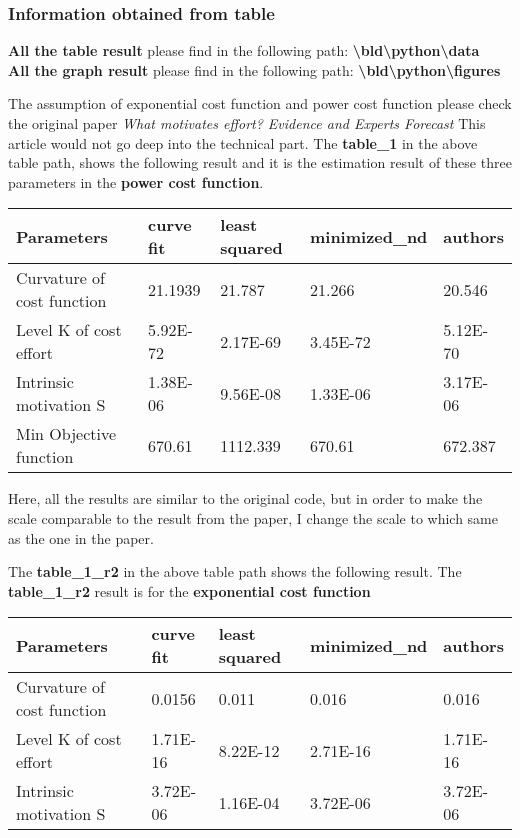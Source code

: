 \documentclass[11pt
]{article}
\begin{document}
\hypertarget{information-obtained-from-table}{%
\subsubsection{Information obtained from
table}\label{information-obtaining-from-table}}

\textbf{All the table result} please find in the following path:
\textbf{\textbackslash bld\textbackslash python\textbackslash data}\\
\textbf{All the graph result} please find in the following path:
\textbf{\textbackslash bld\textbackslash python\textbackslash figures}

The assumption of exponential cost function and power cost function
please check the original paper \emph{What motivates effort? Evidence
and Experts Forecast} This article would not go deep into the technical part.
The \textbf{table\_1} in the above table path, shows the following
result and it is the estimation result of these three parameters in the
\textbf{power cost function}.

\begin{longtable}[]{@{}lllll@{}}
\toprule()
Parameters & curve fit & least squared & minimized\_nd & authors \\
\midrule()
\endhead
Curvature of cost function & 21.1939 & 21.787 & 21.266 & 20.546 \\
Level K of cost effort & 5.92E-72 & 2.17E-69 & 3.45E-72 & 5.12E-70 \\
Intrinsic motivation S & 1.38E-06 & 9.56E-08 & 1.33E-06 & 3.17E-06 \\
Min Objective function & 670.61 & 1112.339 & 670.61 & 672.387 \\
\bottomrule()
\end{longtable}

Here, all the results are similar to the original code, but
in order to make the scale comparable to the result from the paper, I
change the scale to which same as the one in the paper.

The \textbf{table\_1\_r2} in the above table path shows the following
result. The \textbf{table\_1\_r2} result is for the \textbf{exponential
cost function}

\begin{longtable}[]{@{}lllll@{}}
\toprule()
Parameters & curve fit & least squared & minimized\_nd & authors \\
\midrule()
\endhead
Curvature of cost function & 0.0156 & 0.011 & 0.016 & 0.016 \\
Level K of cost effort & 1.71E-16 & 8.22E-12 & 2.71E-16 & 1.71E-16 \\
Intrinsic motivation S & 3.72E-06 & 1.16E-04 & 3.72E-06 & 3.72E-06 \\
\bottomrule()
\end{longtable}
\end{document}

